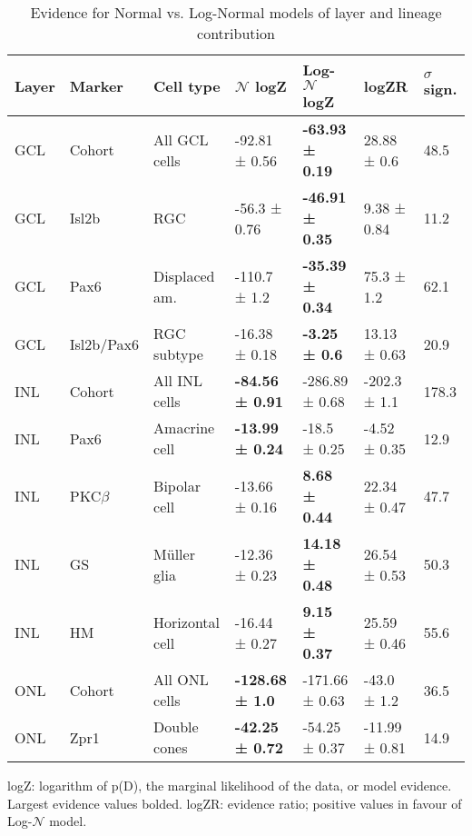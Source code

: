 \begin{table}[!ht]
    \caption{Evidence for Normal vs. Log-Normal models of layer and lineage contribution}
    \begin{tabular}{|l|l|l|l|l|l|l|} 
        \hline
        {\bf Layer} & {\bf Marker} & {\bf Cell type} & {\bf $\mathcal{N}$ logZ} & {\bf Log-$\mathcal{N}$ logZ} & {\bf logZR} & {\bf $\sigma$ sign.}\\ \hline \hline
        GCL & Cohort & All GCL cells & -92.81 ± 0.56 & {\bf-63.93 ± 0.19} & 28.88 ± 0.6 & 48.5\\ \hline \hline
        GCL & Isl2b & RGC & -56.3 ± 0.76 & {\bf -46.91 ± 0.35} & 9.38 ± 0.84 & 11.2\\ \hline
        GCL & Pax6 & Displaced am. & -110.7 ± 1.2 & {\bf -35.39 ± 0.34} & 75.3 ± 1.2 & 62.1\\ \hline
        GCL & Isl2b/Pax6 & RGC subtype & -16.38 ± 0.18 & {\bf -3.25 ± 0.6} & 13.13 ± 0.63 & 20.9\\ \hline \hline
        INL & Cohort & All INL cells & {\bf -84.56 ± 0.91} & -286.89 ± 0.68 & -202.3 ± 1.1 & 178.3\\ \hline \hline
        INL & Pax6 & Amacrine cell & {\bf -13.99 ± 0.24} & -18.5 ± 0.25 & -4.52 ± 0.35 & 12.9\\ \hline
        INL & PKC$\beta$ & Bipolar cell & -13.66 ± 0.16 & {\bf 8.68 ± 0.44} & 22.34 ± 0.47 & 47.7\\ \hline
        INL & GS & M\"{u}ller glia & -12.36 ± 0.23 & {\bf 14.18 ± 0.48} & 26.54 ± 0.53 & 50.3\\ \hline
        INL & HM & Horizontal cell & -16.44 ± 0.27 & {\bf 9.15 ± 0.37} & 25.59 ± 0.46 & 55.6\\ \hline \hline
        ONL & Cohort & All ONL cells & {\bf -128.68 ± 1.0} & -171.66 ± 0.63 & -43.0 ± 1.2 & 36.5\\ \hline \hline
        ONL & Zpr1 & Double cones & {\bf -42.25 ± 0.72} & -54.25 ± 0.37 & -11.99 ± 0.81 & 14.9\\ \hline
    \end{tabular}
   
    \begin{flushleft}logZ: logarithm of p(D), the marginal likelihood of the data, or model evidence.  Largest evidence values bolded. logZR: evidence ratio; positive values in favour of Log-$\mathcal{N}$ model.
    \end{flushleft}
    \label{lineage_nlnev}
\end{table}

